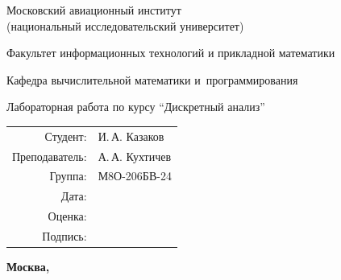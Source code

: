 \documentclass[unicode, 12pt, a4paper,oneside,fleqn]{article}
\begin{document}
\begin{titlepage}
\begin{center}
\bfseries

{\Large Московский авиационный институт\\ (национальный исследовательский университет)

}

\vspace{48pt}

{\large Факультет информационных технологий и прикладной математики
}

\vspace{36pt}

{\large Кафедра вычислительной математики и~программирования

}


\vspace{48pt}

Лабораторная работа  по курсу \enquote{Дискретный анализ}

\end{center}

\vspace{72pt}

\begin{flushright}
\begin{tabular}{rl}
Студент: & И.\,А. Казаков \\
Преподаватель: & А.\,А. Кухтичев \\
Группа: & М8О-206БВ-24 \\
Дата: & \\
Оценка: & \\
Подпись: & \\
\end{tabular}
\end{flushright}

\vfill

\begin{center}
\bfseries
Москва, \the\year
\end{center}
\end{titlepage}

\pagebreak


\pagebreak
\end{document}
